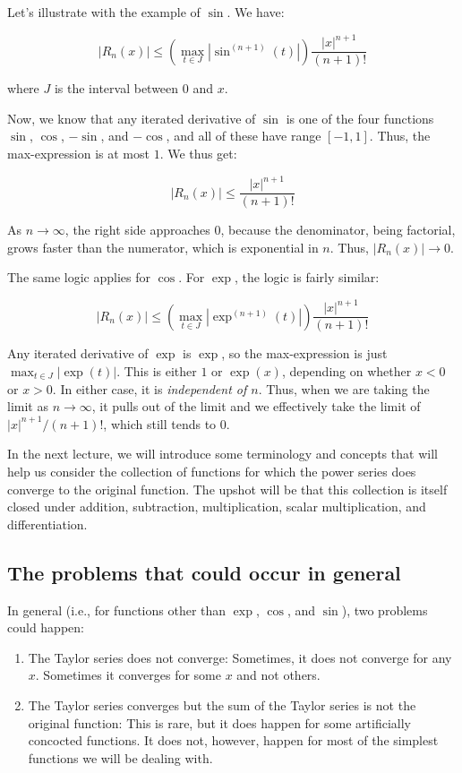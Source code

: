 \documentclass{amsart}
\begin{document}
Let's illustrate with the example of $\sin$. We have:

$$|R_n(x)| \le \left( \max_{t \in J} |\sin^{(n+1)}(t)|\right) \frac{|x|^{n+1}}{(n+1)!}$$

where $J$ is the interval between $0$ and $x$.

Now, we know that any iterated derivative of $\sin$ is one of the four
functions $\sin$, $\cos$, $-\sin$, and $-\cos$, and all of these have
range $[-1,1]$. Thus, the max-expression is at most $1$. We thus get:

$$|R_n(x)| \le \frac{|x|^{n+1}}{(n + 1)!}$$

As $n \to \infty$, the right side approaches $0$, because the
denominator, being factorial, grows faster than the numerator, which
is exponential in $n$. Thus, $|R_n(x)| \to 0$.

The same logic applies for $\cos$. For $\exp$, the logic is fairly similar:

$$|R_n(x)| \le \left( \max_{t \in J} |\exp^{(n+1)}(t)|\right) \frac{|x|^{n+1}}{(n+1)!}$$

Any iterated derivative of $\exp$ is $\exp$, so the max-expression is
just $\max_{t \in J} |\exp(t)|$. This is either $1$ or $\exp(x)$,
depending on whether $x < 0$ or $x > 0$. In either case, it is {\em
independent of $n$}. Thus, when we are taking the limit as $n \to
\infty$, it pulls out of the limit and we effectively take the limit
of $|x|^{n+1}/(n+1)!$, which still tends to $0$.

In the next lecture, we will introduce some terminology and concepts
that will help us consider the collection of functions for which the
power series does converge to the original function. The upshot will
be that this collection is itself closed under addition, subtraction,
multiplication, scalar multiplication, and differentiation.

\subsection{The problems that could occur in general}

In general (i.e., for functions other than $\exp$, $\cos$, and
$\sin$), two problems could happen:

\begin{enumerate}
\item The Taylor series does not converge: Sometimes, it does not
  converge for any $x$. Sometimes it converges for some $x$ and not others.
\item The Taylor series converges but the sum of the Taylor series is
  not the original function: This is rare, but it does happen for some
  artificially concocted functions. It does not, however, happen for
  most of the simplest functions we will be dealing with.
\end{enumerate}
\end{document}

